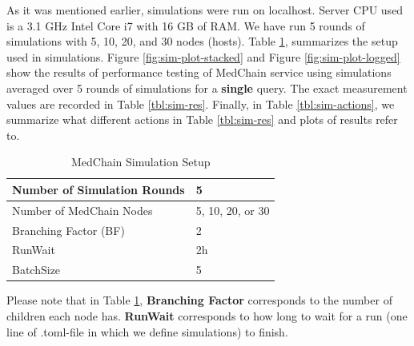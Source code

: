 As it was mentioned earlier, simulations were run on localhost. Server CPU used is a 3.1 GHz Intel Core i7 with 16 GB of RAM. We have run 5 rounds of simulations with 5, 10, 20, and 30 nodes (hosts). 
Table \ref{tbl:sim-setup}, summarizes the setup used in simulations.
Figure \ref{fig:sim-plot-stacked} and Figure \ref{fig:sim-plot-logged} show the results of performance testing of MedChain service using simulations averaged over 5 rounds of simulations for a \textbf{single} query. The exact measurement values are recorded in Table \ref{tbl:sim-res}. Finally, in Table \ref{tbl:sim-actions}, we summarize what different actions in Table \ref{tbl:sim-res} and plots of results refer to.   

\begin{table}[ht]
\centering
\caption{MedChain Simulation Setup}
\label{tbl:sim-setup}
\begin{tabular}{ll}
Number of Simulation Rounds & 5\\
\hline
Number of MedChain Nodes & 5, 10, 20, or 30 \\
\hline
Branching Factor (BF) & 2 \\ 
\hline
 RunWait & 2h  \\
\hline
BatchSize & 5 \\
\hline
\end{tabular}
\end{table}

Please note that in Table \ref{tbl:sim-setup}, \textbf{Branching Factor} corresponds to the number of children each node has. \textbf{RunWait} corresponds to how long to wait for a run (one line of .toml-file in which we define simulations) to finish. 


